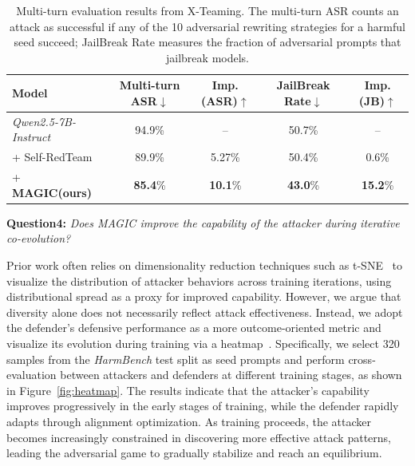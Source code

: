 \documentclass[11pt, letterpaper]{template}
\theoremstyle{plain}
\theoremstyle{definition}
\theoremstyle{remark}
\begin{document}
\begin{table}[ht]
\centering
\scriptsize
\caption{Multi-turn evaluation results from X-Teaming. The multi-turn ASR counts an attack as successful if any of the 10 adversarial rewriting strategies for a harmful seed succeed; JailBreak Rate measures the fraction of adversarial prompts that jailbreak models.}
\label{tab:xteaming_multi_turn}
\begin{tabular}{lcccc}
\toprule
Model & \multicolumn{1}{c}{Multi-turn ASR$\downarrow$} & \multicolumn{1}{c}{Imp. (ASR)$\uparrow$} & \multicolumn{1}{c}{JailBreak Rate$\downarrow$} & \multicolumn{1}{c}{Imp. (JB)$\uparrow$} \\
\midrule
\textit{Qwen2.5-7B-Instruct} & 94.9\% & -- & 50.7\% & -- \\
\quad + Self-RedTeam & 89.9\% & 5.27\% & 50.4\% & 0.6\% \\
\cellcolor{cyan!15}\quad + \textbf{MAGIC(ours)} & \cellcolor{cyan!15}\textbf{85.4}\% & \cellcolor{cyan!15}\textbf{10.1}\% & \cellcolor{cyan!15}\textbf{43.0}\% & \cellcolor{cyan!15}\textbf{15.2}\% \\
\bottomrule
\end{tabular}
\end{table}

\begin{rqbox}
\textbf{Question4:} \textit{Does MAGIC improve the capability of the attacker during iterative co-evolution?}
\end{rqbox}

Prior work often relies on dimensionality reduction techniques such as t-SNE~\citep{maaten2008visualizing} to visualize the distribution of attacker behaviors across training iterations, using distributional spread as a proxy for improved capability. However, we argue that diversity alone does not necessarily reflect attack effectiveness. Instead, we adopt the defender’s defensive performance as a more outcome-oriented metric and visualize its evolution during training via a heatmap~\citep{wang2025adversarial}. Specifically, we select 320 samples from the \textit{HarmBench} test split as seed prompts and perform cross-evaluation between attackers and defenders at different training stages, as shown in Figure~\ref{fig:heatmap}. The results indicate that the attacker’s capability improves progressively in the early stages of training, while the defender rapidly adapts through alignment optimization. As training proceeds, the attacker becomes increasingly constrained in discovering more effective attack patterns, leading the adversarial game to gradually stabilize and reach an equilibrium.
\end{document}
